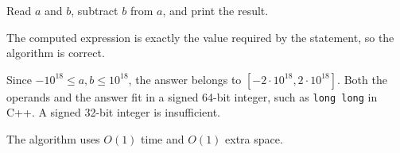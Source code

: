 Read $a$ and $b$, subtract $b$ from $a$, and print the result.

The computed expression is exactly the value required by the statement, so the algorithm is correct.

Since $-10^{18} \le a,b \le 10^{18}$, the answer belongs to $[-2\cdot10^{18},2\cdot10^{18}]$. Both the operands and the answer fit in a signed 64-bit integer, such as \texttt{long long} in C++. A signed 32-bit integer is insufficient.

The algorithm uses $O(1)$ time and $O(1)$ extra space.
